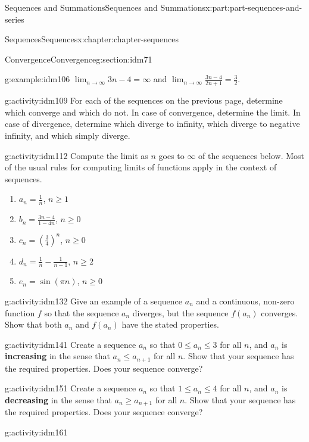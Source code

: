 \documentclass[oneside,10pt,]{book}
\newcommand{\terminology}[1]{\textbf{#1}}
\begin{document}
\begin{partptx}{Sequences and Summations}{}{Sequences and Summations}{}{}{x:part:part-sequences-and-series}
\begin{chapterptx}{Sequences}{}{Sequences}{}{}{x:chapter:chapter-sequences}
\begin{sectionptx}{Convergence}{}{Convergence}{}{}{g:section:idm71}
\begin{example}{}{g:example:idm106}
\(\displaystyle\lim_{n \to \infty} 3n-4 = \infty\) and \(\displaystyle\lim_{n \to \infty} \frac{3n-4}{2n+1} = \frac{3}{2}\).\end{example}
\begin{activity}{}{g:activity:idm109}%
For each of the sequences on the previous page, determine which converge and which do not. In case of convergence, determine the limit. In case of divergence, determine which diverge to infinity, which diverge to negative infinity, and which simply diverge.%
\end{activity}
\begin{activity}{}{g:activity:idm112}%
Compute the limit as \(n\) goes to \(\infty\) of the sequences below. Most of the usual rules for computing limits of functions apply in the context of sequences.%
\begin{enumerate}[font=\bfseries,label=(\alph*),ref=\alph*]
\item{}\(a_n = \frac{1}{n}\), \(n \geq 1\)\item{}\(b_n = \frac{3n-4}{1-4n}\), \(n \geq 0\)\item{}\(c_n = \left(\frac{3}{4}\right)^n\), \(n \geq 0\)\item{}\(d_n = \frac{1}{n} - \frac{1}{n-1}\), \(n \geq 2\)\item{}\(e_n = \sin(\pi n)\), \(n \geq 0\)\end{enumerate}
\end{activity}
\begin{activity}{}{g:activity:idm132}%
Give an example of a sequence \(a_n\) and a continuous, non-zero function \(f\) so that the sequence \(a_n\) diverges, but the sequence \(f(a_n)\) converges. Show that both \(a_n\) and \(f(a_n)\) have the stated properties.%
\end{activity}
\begin{activity}{}{g:activity:idm141}%
Create a sequence \(a_n\) so that \(0 \leq a_n \leq 3\) for all \(n\), and \(a_n\) is \terminology{increasing} in the sense that \(a_n \leq a_{n+1}\) for all \(n\). Show that your sequence has the required properties. Does your sequence converge?%
\end{activity}
\begin{activity}{}{g:activity:idm151}%
Create a sequence \(a_n\) so that \(1 \leq a_n \leq 4\) for all \(n\), and \(a_n\) is \terminology{decreasing} in the sense that \(a_n \geq a_{n+1}\) for all \(n\). Show that your sequence has the required properties. Does your sequence converge?%
\end{activity}
\begin{activity}{}{g:activity:idm161}%

\end{activity}
\end{sectionptx}
\end{chapterptx}
\end{partptx}
\end{document}
